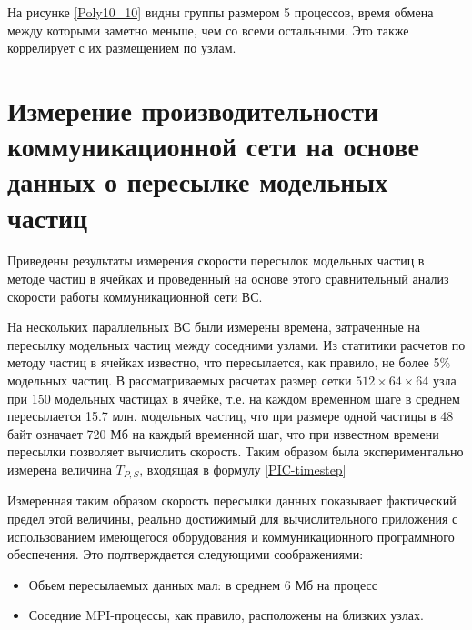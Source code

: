        
        На рисунке \ref{Poly10_10} видны группы размером 5 процессов, время обмена между которыми заметно меньше, чем со всеми остальными. Это также коррелирует с их размещением по узлам.
        
        
        
   \clearpage     
        
        
        
       
        
        
		\section{Измерение производительности коммуникационной сети на основе данных о пересылке модельных частиц}
		Приведены результаты измерения скорости пересылок модельных частиц в методе частиц в ячейках и проведенный на основе этого сравнительный анализ скорости работы коммуникационной сети ВС.
		
		На нескольких параллельных ВС были измерены времена, затраченные на пересылку модельных частиц между соседними узлами. Из статитики расчетов по методу частиц в ячейках известно, что пересылается, как правило, не более 5\% модельных частиц. В рассматриваемых расчетах размер сетки $512\times 64 \times 64$ узла  при 150 модельных частицах в ячейке, т.е.  на каждом временном шаге в среднем пересылается 15.7 млн. модельных частиц, что при размере одной частицы в 48 байт означает 720 Мб на каждый временной шаг, что при известном времени пересылки позволяет вычислить скорость. Таким образом была экспериментально измерена величина $T_{P,S}$, входящая в формулу \ref{PIC-timestep}   
			
			
			
			Измеренная таким образом скорость пересылки данных показывает фактический предел этой величины, реально достижимый для вычислительного приложения с использованием имеющегося оборудования и коммуникационного программного обеспечения. Это подтверждается следующими соображениями:
			\begin{itemize}
				\item Объем пересылаемых данных мал: в среднем 6 Мб на процесс
				\item Соседние MPI-процессы, как правило, расположены на близких узлах.
			\end{itemize}  	 
			
